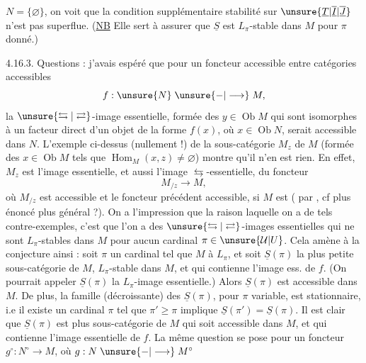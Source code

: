  $N=\{\varnothing\}$, on voit que la condition supplémentaire
 stabilité sur $\unsure{\underline T|\overline{\underline I}|\overline{\underline J}}$ n'est pas
superflue. (\uline{NB} Elle sert à assurer que
$\underline S$ est $L_\pi$-stable dans $M$ pour $\pi$ donné.)

4.16.3. Questions  : j'avais espéré
que pour un foncteur accessible entre
catégories accessibles
\[
f:\unsure{N}\mathrel{\unsure{-|\longrightarrow}}M,
\]
la $\unsure{\leftrightarrows|\rightleftarrows}$-image essentielle, formée des $y\in\operatorname{Ob}M$
qui sont isomorphes à un facteur direct
d'un objet de la forme $f(x)$, où $x\in\operatorname{Ob}N$,
serait accessible dans $N$. L'exemple
ci-dessus (nullement  !) de
la sous-catégorie $M_z$ de $M$ (formée des
$x\in\operatorname{Ob}M$ tels que $\operatorname{Hom}_M(x,z)\ne\varnothing$) montre
qu'il n'en est rien. En effet, $M_z$ est
l'image essentielle, et aussi l'image $\leftrightarrows$-essentielle,
du foncteur
\[
M_{/z}\longrightarrow M,
\]
où $M_{/z}$ est accessible et le foncteur précédent
accessible, si $M$ est  (
par , cf plus  énoncé plus général ?).
On a l'impression que la raison  laquelle
on a de tels contre-exemples, c'est que
l'on a des $\unsure{\leftrightarrows|\rightleftarrows}$-images essentielles qui ne sont
 $L_\pi$-stables dans $M$ pour aucun
cardinal $\pi\in\unsure{\mathcal U|U}$. Cela amène à 
la conjecture ainsi : soit $\pi$ un cardinal
tel que $M$  à $L_\pi$, et soit
$\underline S(\pi)$ la plus petite sous-catégorie  de
$M$, $L_\pi$-stable dans $M$, et qui contienne
l'image ess. de $f$. (On pourrait appeler
$\underline S(\pi)$ la $L_\pi$-image essentielle.) Alors $\underline S(\pi)$
est accessible dans $M$. De plus, la famille
(décroissante) des $\underline S(\pi)$, pour $\pi$ variable,
est stationnaire, i.e il existe un cardinal
$\pi$ tel que $\pi'\geq\pi$ implique $\underline S(\pi')=\underline S(\pi)$.
Il est clair  que $\underline S(\pi)$ est  plus 
sous-catégorie de $M$ qui soit accessible dans $M$,
et qui contienne l'image essentielle de
$f$. La même question se pose pour
un foncteur $g^{\circ}:N^{\circ}\longrightarrow M$, où $g:N\mathrel{\unsure{-|\longrightarrow}}M^{\circ}$
